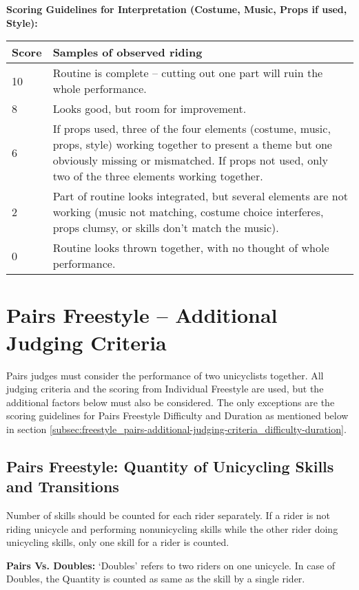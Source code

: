 \textbf{Scoring Guidelines for Interpretation (Costume, Music, Props if used, Style):}

\begin{tabular}{|l|p{12.5cm}|}
\hline
\textbf{Score} & \textbf{Samples of observed riding} \\
\hline
10 & Routine is complete – cutting out one part will ruin the whole performance. \\
\hline
8 & Looks good, but room for improvement. \\
\hline
6 & If props used, three of the four elements (costume, music, props, style) working together to present a theme but one obviously missing or mismatched.
If props not used, only two of the three elements working together. \\
\hline
2 & Part of routine looks integrated, but several elements are not working (music not matching, costume choice interferes, props clumsy, or skills don't match the music). \\
\hline
0 & Routine looks thrown together, with no thought of whole performance. \\
\hline
\end{tabular}

\section{Pairs Freestyle – Additional Judging Criteria}
Pairs judges must consider the performance of two unicyclists together.
All judging criteria and the scoring from Individual Freestyle are used, but the additional factors below must also be considered.
The only exceptions are the scoring guidelines for Pairs Freestyle Difficulty and Duration as mentioned below in section \ref{subsec:freestyle_pairs-additional-judging-criteria_difficulty-duration}.

\subsection{Pairs Freestyle: Quantity of Unicycling Skills and Transitions \label{subsec:freestyle_pairs-additional-judging-criteria_quantity}}
Number of skills should be counted for each rider separately.
If a rider is not riding unicycle and performing nonunicycling skills while the other rider doing unicycling skills, only one skill for a rider is counted.

\textbf{Pairs Vs. Doubles:} `Doubles' refers to two riders on one unicycle.
In case of Doubles, the Quantity is counted as same as the skill by a single rider.

